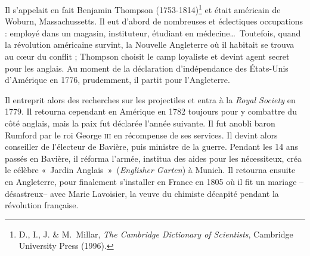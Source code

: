 \atstartofhistorysection
{}
\label{ch_histoire_rumford_depondt}


	Il s'appelait en fait Benjamin Thompson (1753-1814)\footnote{D., I., J. \& M.~Millar, \textit{The Cambridge Dictionary of Scientists}, Cambridge University Press (1996).} et était américain de Woburn, Massachussetts. Il eut d'abord de nombreuses et éclectiques occupations : employé dans un magasin, instituteur, étudiant en médecine…\ Toutefois, quand la révolution américaine survint, la Nouvelle Angleterre où il habitait se trouva au cœur du conflit ; Thompson choisit le camp loyaliste et devint agent secret pour les anglais. Au moment de la déclaration d'indépendance des États-Unis d'Amérique en 1776, prudemment, il partit pour l'Angleterre. 

	Il entreprit alors des recherches sur les projectiles et entra à la \textit{Royal Society} en 1779. Il retourna cependant en Amérique en 1782 toujours pour y combattre du côté anglais, mais la paix fut déclarée l'année suivante. Il fut anobli baron Rumford par le roi George \textsc{iii} en récompense de ses services. Il devint alors conseiller de l'électeur de Bavière, puis ministre de la guerre. Pendant les 14 ans passés en Bavière, il réforma l'armée, institua des aides pour les nécessiteux, créa le célèbre «~Jardin Anglais~»\ (\textit{Englisher Garten}) à Munich. Il retourna ensuite en Angleterre, pour finalement s'installer en France en 1805 où il fit un mariage --désastreux-- avec Marie Lavoisier, la veuve du chimiste décapité pendant la révolution française. 

